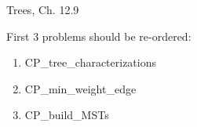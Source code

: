\documentclass[handout]{mcs}
\begin{document}

\begin{staffnotes}
Trees, Ch. 12.9 
\end{staffnotes}


\begin{staffnotes}

First 3 problems should be re-ordered:
\begin{enumerate}

\item CP_tree_characterizations

\item CP_min_weight_edge

\item CP_build_MSTs

\end{enumerate}

\end{staffnotes}







\end{document}
